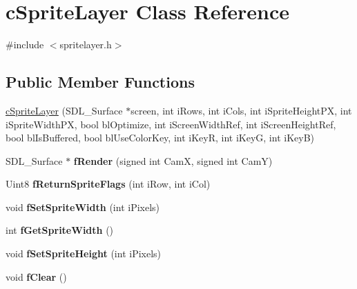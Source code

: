 \hypertarget{classc_sprite_layer}{\section{c\-Sprite\-Layer Class Reference}
\label{classc_sprite_layer}
}


{\ttfamily \#include $<$spritelayer.\-h$>$}

\subsection*{Public Member Functions}
\begin{DoxyCompactItemize}
\item 
\hyperlink{classc_sprite_layer_addc97ed142fff8c38fefa777a6aeab9e}{c\-Sprite\-Layer} (S\-D\-L\-\_\-\-Surface $\ast$screen, int i\-Rows, int i\-Cols, int i\-Sprite\-Height\-P\-X, int i\-Sprite\-Width\-P\-X, bool bl\-Optimize, int i\-Screen\-Width\-Ref, int i\-Screen\-Height\-Ref, bool bl\-Is\-Buffered, bool bl\-Use\-Color\-Key, int i\-Key\-R, int i\-Key\-G, int i\-Key\-B)
\item 
\hypertarget{classc_sprite_layer_ab6962819241e36e554c0559726fca708}{S\-D\-L\-\_\-\-Surface $\ast$ {\bfseries f\-Render} (signed int Cam\-X, signed int Cam\-Y)}\label{classc_sprite_layer_ab6962819241e36e554c0559726fca708}

\item 
\hypertarget{classc_sprite_layer_a84650f8fab3823252ab60d464dfb6599}{Uint8 {\bfseries f\-Return\-Sprite\-Flags} (int i\-Row, int i\-Col)}\label{classc_sprite_layer_a84650f8fab3823252ab60d464dfb6599}

\item 
\hypertarget{classc_sprite_layer_a6ec5ded5090bebcfacdbb7ced1a39811}{void {\bfseries f\-Set\-Sprite\-Width} (int i\-Pixels)}\label{classc_sprite_layer_a6ec5ded5090bebcfacdbb7ced1a39811}

\item 
\hypertarget{classc_sprite_layer_ae0a59d8841d6d9b6e70e9617df2e3385}{int {\bfseries f\-Get\-Sprite\-Width} ()}\label{classc_sprite_layer_ae0a59d8841d6d9b6e70e9617df2e3385}

\item 
\hypertarget{classc_sprite_layer_acf20667a25f361e4407120d30a367aa6}{void {\bfseries f\-Set\-Sprite\-Height} (int i\-Pixels)}\label{classc_sprite_layer_acf20667a25f361e4407120d30a367aa6}

\item 
\hypertarget{classc_sprite_layer_a8a6700ceef1c83f952154b298d881776}{void {\bfseries f\-Clear} ()}\label{classc_sprite_layer_a8a6700ceef1c83f952154b298d881776}


\end{DoxyCompactItemize}
